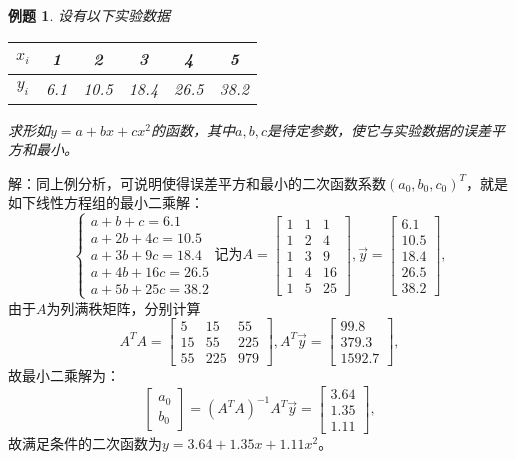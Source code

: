 \documentclass[a4paper]{book}
\newtheorem{eg}{例题}[chapter]
\begin{document}
\begin{eg}
设有以下实验数据
\begin{table}[H]
\centering
\begin{tabular}{cccccc}
  \hline
   $x_i$ & 1 & 2 & 3& 4 &5 \\
   \hline
   $y_i$ & 6.1 & 10.5 & 18.4& 26.5&38.2 \\
  \hline
\end{tabular}
\end{table}
求形如$y=a+bx+cx^2$的函数，其中$a,b,c$是待定参数，使它与实验数据的误差平方和最小。
\end{eg}
解：同上例分析，可说明使得误差平方和最小的二次函数系数$(a_0,b_0,c_0)^T$，就是
如下线性方程组的最小二乘解：
\begin{equation*}
\begin{cases}
a+b+c=6.1\\
a+2b+4c=10.5\\
a+3b+9c=18.4\\
a+4b+16c=26.5\\
a+5b+25c=38.2
\end{cases}
\text{记为}
A=\begin{bmatrix}
1&1&1\\1&2&4\\1&3&9\\1&4&16\\1&5&25
\end{bmatrix},
\vec{y}=\begin{bmatrix}
6.1\\10.5\\18.4\\26.5\\38.2
\end{bmatrix},
\end{equation*}
由于$A$为列满秩矩阵，分别计算
\begin{equation*}
A^TA=\begin{bmatrix}5&15&55\\15&55&225\\55&225&979\end{bmatrix},
A^T\vec{y}=\begin{bmatrix}99.8\\379.3\\1592.7\end{bmatrix},
\end{equation*}
故最小二乘解为：
\begin{equation*}
\begin{bmatrix}a_0\\b_0\end{bmatrix}=
(A^TA)^{-1}A^T\vec{y}=\begin{bmatrix}3.64\\1.35\\1.11\end{bmatrix},
\end{equation*}
故满足条件的二次函数为$y=3.64+1.35x+1.11x^2$。
\end{document}
